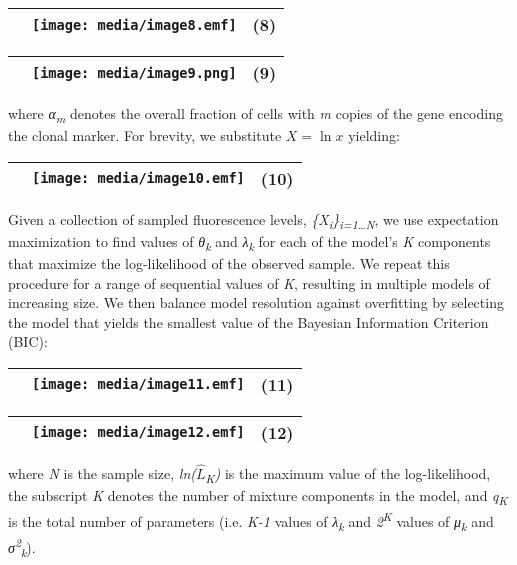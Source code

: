 \begin{longtable}[]{@{}lll@{}}
\toprule
& \texttt{[image: media/image8.emf]} & (8)\tabularnewline
\bottomrule
\end{longtable}

\begin{longtable}[]{@{}lll@{}}
\toprule
& \texttt{[image: media/image9.png]} & (9)\tabularnewline
\bottomrule
\end{longtable}

where \emph{α\textsubscript{m}} denotes the overall fraction of cells with \emph{m} copies of the gene encoding the clonal marker. For brevity, we substitute \(X = \ln x\) yielding:

\begin{longtable}[]{@{}lll@{}}
\toprule
& \texttt{[image: media/image10.emf]} & (10)\tabularnewline
\bottomrule
\end{longtable}

Given a collection of sampled fluorescence levels, \emph{\{X\textsubscript{i}\}\textsubscript{i=1\ldots{}N}}, we use expectation maximization to find values of \emph{θ\textsubscript{k}} and \emph{λ\textsubscript{k}} for each of the model's \emph{K} components that maximize the log-likelihood of the observed sample. We repeat this procedure for a range of sequential values of \emph{K}, resulting in multiple models of increasing size. We then balance model resolution against overfitting by selecting the model that yields the smallest value of the Bayesian Information Criterion (BIC):

\begin{longtable}[]{@{}lll@{}}
\toprule
& \texttt{[image: media/image11.emf]} & (11)\tabularnewline
\bottomrule
\end{longtable}

\begin{longtable}[]{@{}lll@{}}
\toprule
& \texttt{[image: media/image12.emf]} & (12)\tabularnewline
\bottomrule
\end{longtable}

where \emph{N} is the sample size, \emph{ln(}\(\widehat{L}\)\emph{\textsubscript{K})} is the maximum value of the log-likelihood, the subscript \emph{K} denotes the number of mixture components in the model, and \emph{q\textsubscript{K}} is the total number of parameters (i.e. \emph{K-1} values of \emph{λ\textsubscript{k}} and \emph{2\textsuperscript{K}} values of \emph{μ\textsubscript{k}} and \emph{σ\textsuperscript{2}\textsubscript{k}}).

